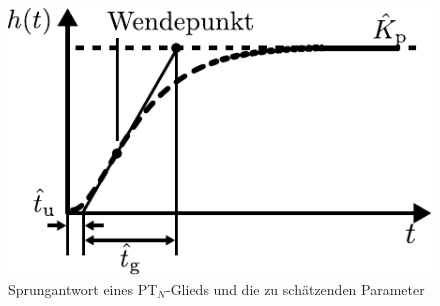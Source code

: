 %
%
\begin{figure}[h]
	\centering
	\includegraphics[width=0.45\linewidth]{Abbildungen/Modellbildung/PDF/ExperimentelPTn.pdf}
	\caption{Sprungantwort eines PT$_{N}$-Glieds und die zu schätzenden Parameter \cite{Foellinger94}}
	\label{fig:experimptn}
\end{figure}
%
